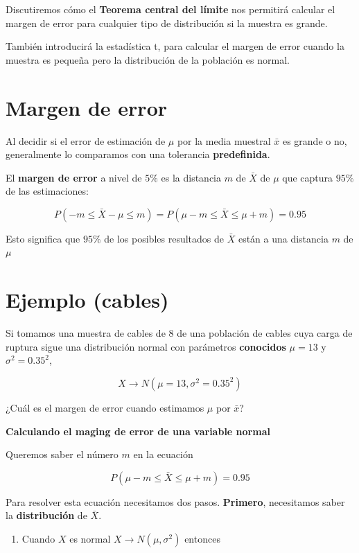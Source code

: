 \documentclass[
]{book}
\providecommand{\tightlist}{%
  \setlength{\itemsep}{0pt}\setlength{\parskip}{0pt}}
\begin{document}
Discutiremos cómo el \textbf{Teorema central del límite } nos permitirá calcular el margen de error para cualquier tipo de distribución si la muestra es grande.

También introducirá la estadística t, para calcular el margen de error cuando la muestra es pequeña pero la distribución de la población es normal.

\hypertarget{margen-de-error}{%
\section{Margen de error}\label{margen-de-error}}

Al decidir si el error de estimación de \(\mu\) por la media muestral \(\bar{x}\) es grande o no, generalmente lo comparamos con una tolerancia \textbf{predefinida}.

El \textbf{margen de error} a nivel de \(5\%\) es la distancia \(m\) de \(\bar{X}\) de \(\mu\) que captura \(95\%\) de las estimaciones:

\[P(-m \leq \bar{X}-\mu \leq m)=P(\mu-m \leq \bar{X} \leq\mu + m)=0.95\]

Esto significa que \(95\%\) de los posibles resultados de \(\bar{X}\) están a una distancia \(m\) de \(\mu\)

\hypertarget{ejemplo-cables}{%
\section{Ejemplo (cables)}\label{ejemplo-cables}}

Si tomamos una muestra de cables de \(8\) de una población de cables cuya carga de ruptura sigue una distribución normal con parámetros \textbf{conocidos} \(\mu=13\) y \(\sigma^2=0.35^2\),

\[X \rightarrow N(\mu=13, \sigma^2=0.35^2)\]

¿Cuál es el margen de error cuando estimamos \(\mu\) por \(\bar{x}\)?

\textbf{Calculando el maging de error de una variable normal}

Queremos saber el número \(m\) en la ecuación

\[P(\mu-m \leq \bar{X} \leq\mu + m)=0.95\]

Para resolver esta ecuación necesitamos dos pasos. \textbf{Primero}, necesitamos saber la \textbf{distribución} de \(\bar{X}\).

\begin{enumerate}
\def\labelenumi{\arabic{enumi}.}
\tightlist
\item
  Cuando \(X\) es normal \(X \rightarrow N(\mu, \sigma^2)\) entonces
\end{enumerate}
\end{document}
